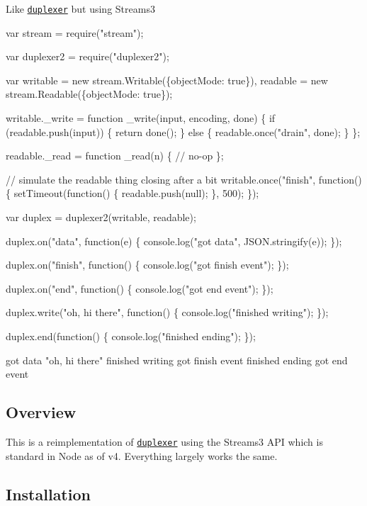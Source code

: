 Like \href{https://github.com/Raynos/duplexer}{\tt duplexer} but using Streams3


\begin{DoxyCode}
var stream = require("stream");

var duplexer2 = require("duplexer2");

var writable = new stream.Writable(\{objectMode: true\}),
    readable = new stream.Readable(\{objectMode: true\});

writable.\_write = function \_write(input, encoding, done) \{
  if (readable.push(input)) \{
    return done();
  \} else \{
    readable.once("drain", done);
  \}
\};

readable.\_read = function \_read(n) \{
  // no-op
\};

// simulate the readable thing closing after a bit
writable.once("finish", function() \{
  setTimeout(function() \{
    readable.push(null);
  \}, 500);
\});

var duplex = duplexer2(writable, readable);

duplex.on("data", function(e) \{
  console.log("got data", JSON.stringify(e));
\});

duplex.on("finish", function() \{
  console.log("got finish event");
\});

duplex.on("end", function() \{
  console.log("got end event");
\});

duplex.write("oh, hi there", function() \{
  console.log("finished writing");
\});

duplex.end(function() \{
  console.log("finished ending");
\});
\end{DoxyCode}



\begin{DoxyCode}
got data "oh, hi there"
finished writing
got finish event
finished ending
got end event
\end{DoxyCode}


\subsection*{Overview}

This is a reimplementation of \href{https://www.npmjs.com/package/duplexer}{\tt duplexer} using the Streams3 A\+PI which is standard in Node as of v4. Everything largely works the same.

\subsection*{Installation}

